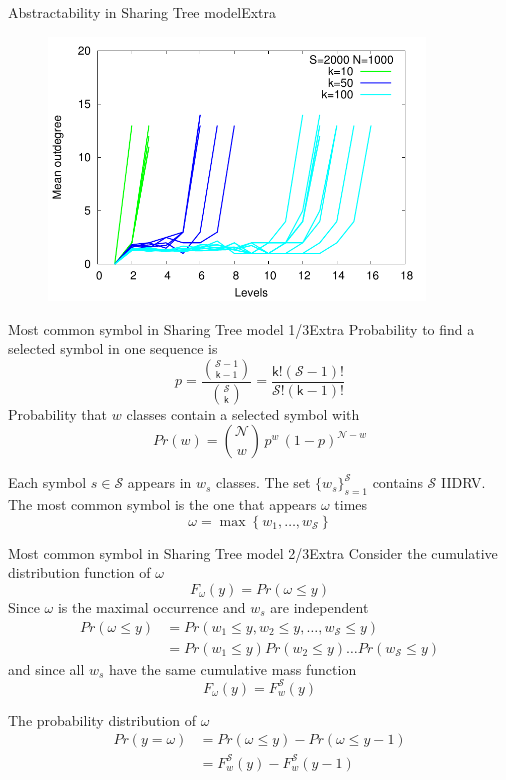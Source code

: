 \documentclass[11pt,svgnames]{beamer}
\renewcommand{\kappa}{\mathsf k}
\newcommand{\Esse}{\mathcal S}
\newcommand{\Enne}{\mathcal N}
\begin{document}
\begin{frame}[noframenumbering]{Abstractability in Sharing Tree model}{Extra}
\begin{figure}[p]%
\includegraphics[width=10cm,draft=false]{immagini/extra_treekappa.pdf}
\end{figure}
\end{frame}
\begin{frame}[noframenumbering]{Most common symbol in Sharing Tree model 1/3}{Extra}
Probability to find a selected symbol in one sequence is
\[ p = \frac{\binom{\Esse-1}{\kappa-1}}{\binom{\Esse}{\kappa}}= \frac{\kappa!(\Esse -1)!}{\Esse!(\kappa -1)!} \]
Probability that $w$ classes contain a selected symbol with
\[ Pr(w) = \binom{\Enne}{w} \, p^{w} \, (1-p)^{\Enne-w} \]

Each symbol $s \in \Esse$ appears in $w_s$ classes. The set $\{w_s\}_{s=1}^{\Esse}$ contains $\Esse$ IIDRV. The most common symbol is the one that appears $\omega$ times
\[ \omega = \max \left\{ w_1, \dots, w_{\Esse} \right\} \]
\end{frame}

\begin{frame}[noframenumbering]{Most common symbol in Sharing Tree model 2/3}{Extra}
Consider the cumulative distribution function of $\omega$
\[ F_{\omega} (y)= Pr(\omega \leq y) \]
Since $\omega$ is the maximal occurrence and $w_s$ are independent
\begin{align*}
Pr(\omega \leq y) &= Pr(w_1 \leq y, w_2 \leq y, \dots, w_{\Esse} \leq y) \\
&= Pr(w_1 \leq y) Pr(w_2 \leq y) \dots Pr(w_{\Esse} \leq y)
\end{align*}
and since all $w_s$ have the same cumulative mass function
\[ F_{\omega} (y) = F_{w}^{\Esse} (y) \]

The probability distribution of $\omega$
\begin{align*}
Pr (y = \omega) &= Pr (\omega \leq y) - Pr (\omega \leq y-1) \\
&= F_w^{\Esse} (y) - F_w^{\Esse} (y-1)
\end{align*}
\end{frame}
\end{document}
